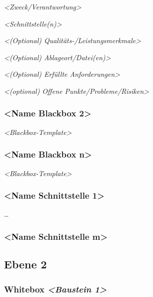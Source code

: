 \documentclass[
]{article}
\begin{document}
\emph{\textless Zweck/Verantwortung\textgreater{}}

\emph{\textless Schnittstelle(n)\textgreater{}}

\emph{\textless(Optional) Qualitäts-/Leistungsmerkmale\textgreater{}}

\emph{\textless(Optional) Ablageort/Datei(en)\textgreater{}}

\emph{\textless(Optional) Erfüllte Anforderungen\textgreater{}}

\emph{\textless(optional) Offene Punkte/Probleme/Risiken\textgreater{}}

\hypertarget{__name_blackbox_2}{%
\subsubsection{\textless Name Blackbox
2\textgreater{}}\label{__name_blackbox_2}}

\emph{\textless Blackbox-Template\textgreater{}}

\hypertarget{__name_blackbox_n}{%
\subsubsection{\textless Name Blackbox
n\textgreater{}}\label{__name_blackbox_n}}

\emph{\textless Blackbox-Template\textgreater{}}

\hypertarget{__name_schnittstelle_1}{%
\subsubsection{\textless Name Schnittstelle
1\textgreater{}}\label{__name_schnittstelle_1}}

\ldots{}

\hypertarget{__name_schnittstelle_m}{%
\subsubsection{\textless Name Schnittstelle
m\textgreater{}}\label{__name_schnittstelle_m}}

\hypertarget{_ebene_2}{%
\subsection{Ebene 2}\label{_ebene_2}}

\hypertarget{_whitebox_emphasis_baustein_1_emphasis}{%
\subsubsection{\texorpdfstring{Whitebox \emph{\textless Baustein
1\textgreater{}}}{Whitebox \textless Baustein 1\textgreater{}}}\label{_whitebox_emphasis_baustein_1_emphasis}}
\end{document}
